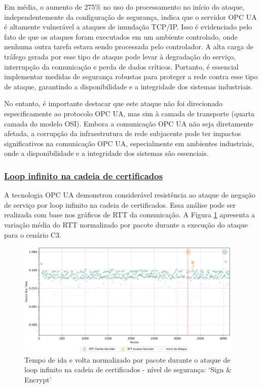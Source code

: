             Em média, o aumento de 275\% no uso do processamento no início do ataque, independentemente da configuração de segurança, indica que o servidor OPC UA é altamente vulnerável a ataques de inundação TCP/IP. Isso é evidenciado pelo fato de que os ataques foram executados em um ambiente controlado, onde nenhuma outra tarefa estava sendo processada pelo controlador. A alta carga de tráfego gerada por esse tipo de ataque pode levar à degradação do serviço, interrupção da comunicação e perda de dados críticos. Portanto, é essencial implementar medidas de segurança robustas para proteger a rede contra esse tipo de ataque, garantindo a disponibilidade e a integridade dos sistemas industriais.

            No entanto, é importante destacar que este ataque não foi direcionado especificamente ao protocolo OPC UA, mas sim à camada de transporte (quarta camada do modelo OSI). Embora a comunicação OPC UA não seja diretamente afetada, a corrupção da infraestrutura de rede subjacente pode ter impactos significativos na comunicação OPC UA, especialmente em ambientes industriais, onde a disponibilidade e a integridade dos sistemas são essenciais.

        \subsubsection*{\underline{Loop infinito na cadeia de certificados}}

            A tecnologia OPC UA demonstrou considerável resistência ao ataque de negação de serviço por loop infinito na cadeia de certificados. Essa análise pode ser realizada com base nos gráficos de RTT da comunicação. A Figura \ref{fig:0-dos-cert-rttp} apresenta a variação média do RTT normalizado por pacote durante a execução do ataque para o cenário C3.

            \begin{figure}[htbp!]
                \caption{\label{fig:0-dos-cert-rttp}Tempo de ida e volta normalizado por pacote durante o ataque de loop infinito na cadeia de certificados - nível de segurança: `Sign \& Encrypt'}
                \begin{center}
                    \includegraphics[width=0.972\textwidth]{USPSC-img/output/cropped/2-dos_certificate_inf_chain_loop-rttp.png}
                \end{center}
            \end{figure}

